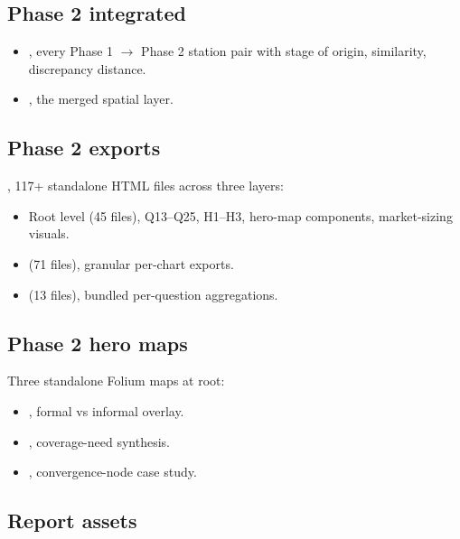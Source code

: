 \subsection{Phase 2 integrated}

\begin{itemize}\setlength{\itemsep}{0pt}
 \item {}, every Phase 1 $\to$ Phase 2 station
 pair with stage of origin, similarity, discrepancy distance.
 \item {}, the merged spatial layer.
\end{itemize}

\subsection{Phase 2 exports}

, 117+ standalone HTML files across three layers:

\begin{itemize}
 \item Root level (45 files), Q13--Q25, H1--H3, hero-map components,
 market-sizing visuals.
 \item {} (71 files), granular
 per-chart exports.
 \item {} (13 files), bundled
 per-question aggregations.
\end{itemize}

\subsection{Phase 2 hero maps}

Three standalone Folium maps at  root:

\begin{itemize}
 \item {}, formal vs informal overlay.
 \item {}, coverage-need
 synthesis.
 \item {}, convergence-node case study.
\end{itemize}

\subsection{Report assets}

